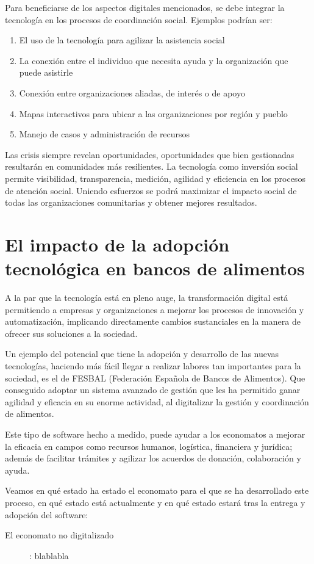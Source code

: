 \vspace{1em}
\par Para beneficiarse de los aspectos digitales mencionados, se debe integrar la tecnología en los procesos de coordinación social. Ejemplos podrían ser:
\begin{enumerate}
    \item El uso de la tecnología para agilizar la asistencia social
    \item La conexión entre el individuo que necesita ayuda y la organización que puede asistirle
    \item Conexión entre organizaciones aliadas, de interés o de apoyo
    \item Mapas interactivos para ubicar a las organizaciones por región y pueblo
    \item Manejo de casos y administración de recursos
\end{enumerate}
\vspace{1em}
\par Las crisis siempre revelan oportunidades, oportunidades que bien gestionadas resultarán en comunidades más resilientes. La tecnología como inversión social permite visibilidad, transparencia, medición, agilidad y eficiencia en los procesos de atención social. Uniendo esfuerzos se podrá maximizar el impacto social de todas las organizaciones comunitarias y obtener mejores resultados.

\section{El impacto de la adopción tecnológica en bancos de alimentos}
A la par que la tecnología está en pleno auge, la transformación digital está permitiendo a empresas y organizaciones a mejorar los procesos de innovación y automatización, implicando directamente cambios sustanciales en la manera de ofrecer sus soluciones a la sociedad.
\vspace{1em}
\par Un ejemplo del potencial que tiene la adopción y desarrollo de las nuevas tecnologías, haciendo más fácil llegar a realizar labores tan importantes para la sociedad, es el de FESBAL (Federación Española de Bancos de Alimentos). Que conseguido adoptar un sistema avanzado de gestión que les ha permitido ganar agilidad y eficacia en su enorme actividad, al digitalizar la gestión y coordinación de alimentos.
\vspace{1em}
\par Este tipo de software hecho a medido, puede ayudar a los economatos a mejorar la eficacia en campos como recursos humanos, logística, financiera y jurídica; además de facilitar trámites y agilizar los acuerdos de donación, colaboración y ayuda.
\vspace{1em}
\par Veamos en qué estado ha estado el economato para el que se ha desarrollado este proceso, en qué estado está actualmente y en qué estado estará tras la entrega y adopción del software:
\begin{description}
  \item[El economato no digitalizado]: blablabla
\end{description}
